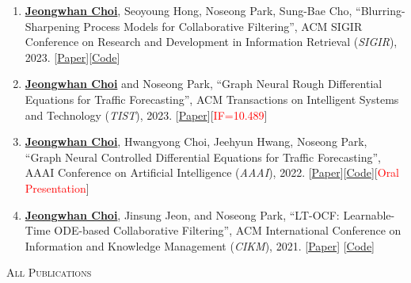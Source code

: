 \documentclass[10pt]{article}
\newenvironment{changemargin}[2]{
  \begin{list}{}{
    \setlength{\topsep}{0pt}
    \setlength{\leftmargin}{#1}
    \setlength{\rightmargin}{#2}
    \setlength{\listparindent}{\parindent}
    \setlength{\itemindent}{\parindent}
    \setlength{\parsep}{\parskip}
  }
  \item[]}{\end{list}
}
\newcommand{\lineover}{
	\begin{changemargin}{-0.05in}{-0.05in}
		\vspace*{-8pt}
		\hrulefill \\
		\vspace*{-2pt}
	\end{changemargin}
}
\newcommand{\header}[1]{
	\begin{changemargin}{-0.5in}{-0.5in}
		\scshape{#1}\\
  	\lineover
	\end{changemargin}
}
\newcommand{\RED}[1]{\textcolor{red}{#1}}
\newcommand{\textbu}[1]{\underline{\textbf{#1}}}
\newenvironment{body} {
	\vspace*{-16pt}
	\begin{changemargin}{-0.25in}{-0.5in}
  }
	{\end{changemargin}
}
\begin{document}
\begin{body}
\begin{enumerate}
    \item \textbu{Jeongwhan Choi}, Seoyoung Hong, Noseong Park, Sung-Bae Cho, ``Blurring-Sharpening Process Models for Collaborative Filtering'', ACM SIGIR Conference on Research and Development in Information Retrieval (\textit{SIGIR}), 2023. [\href{https://arxiv.org/abs/2211.09324}{Paper}][\href{https://github.com/jeongwhanchoi/bspm}{Code}]
    \item \textbu{Jeongwhan Choi} and Noseong Park, ``Graph Neural Rough Differential Equations for Traffic Forecasting'', ACM Transactions on Intelligent Systems and Technology (\textit{TIST}), 2023. [\href{https://dl.acm.org/doi/abs/10.1145/3604808}{Paper}][\RED{IF=10.489}]
    \item \textbu{Jeongwhan Choi}, Hwangyong Choi, Jeehyun Hwang, Noseong Park, ``Graph Neural Controlled Differential Equations for Traffic Forecasting'', AAAI Conference on Artificial Intelligence (\textit{AAAI}), 2022. [\href{https://ojs.aaai.org/index.php/AAAI/article/download/20587/20346}{Paper}][\href{https://github.com/jeongwhanchoi/STG-NCDE}{Code}][\RED{Oral Presentation}] 
    \item \textbu{Jeongwhan Choi}, Jinsung Jeon, and Noseong Park, ``LT-OCF: Learnable-Time ODE-based Collaborative Filtering'', ACM International Conference on Information and Knowledge Management (\textit{CIKM}), 2021. [\href{https://arxiv.org/pdf/2108.06208.pdf}{Paper}] [\href{https://github.com/jeongwhanchoi/LT-OCF}{Code}] 
\end{enumerate}
\end{body}
\vspace{14pt}

\header{All Publications}
\end{document}
